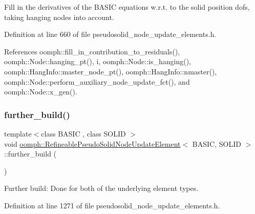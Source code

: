 Fill in the derivatives of the B\+A\+S\+IC equations w.\+r.\+t. to the solid position dofs, taking hanging nodes into account. 



Definition at line 660 of file pseudosolid\+\_\+node\+\_\+update\+\_\+elements.\+h.



References oomph\+::fill\+\_\+in\+\_\+contribution\+\_\+to\+\_\+residuals(), oomph\+::\+Node\+::hanging\+\_\+pt(), i, oomph\+::\+Node\+::is\+\_\+hanging(), oomph\+::\+Hang\+Info\+::master\+\_\+node\+\_\+pt(), oomph\+::\+Hang\+Info\+::nmaster(), oomph\+::\+Node\+::perform\+\_\+auxiliary\+\_\+node\+\_\+update\+\_\+fct(), and oomph\+::\+Node\+::x\+\_\+gen().

\mbox{\label{classoomph_1_1RefineablePseudoSolidNodeUpdateElement_a19e2a578e4d8a0e08041e2a0cf33d06f}} 
\subsubsection{\texorpdfstring{further\+\_\+build()}{further\_build()}}
{\footnotesize\ttfamily template$<$class B\+A\+S\+IC , class S\+O\+L\+ID $>$ \\
void \hyperlink{classoomph_1_1RefineablePseudoSolidNodeUpdateElement}{oomph\+::\+Refineable\+Pseudo\+Solid\+Node\+Update\+Element}$<$ B\+A\+S\+IC, S\+O\+L\+ID $>$\+::further\+\_\+build (\begin{DoxyParamCaption}{ }\end{DoxyParamCaption})\hspace{0.3cm}{\ttfamily [inline]}}

Further build\+: Done for both of the underlying element types. 

Definition at line 1271 of file pseudosolid\+\_\+node\+\_\+update\+\_\+elements.\+h.

\mbox{\label{classoomph_1_1RefineablePseudoSolidNodeUpdateElement_a7f2375e2097699d5a175db3bc9f6b868}} 
